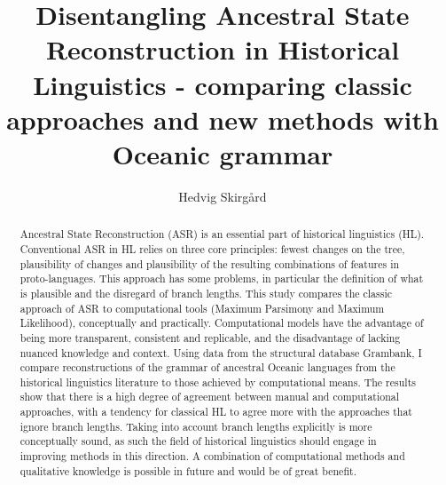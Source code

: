 \documentclass[12pt,letterpaper]{article}
\title{Disentangling Ancestral State Reconstruction in Historical Linguistics - comparing classic approaches and new methods with Oceanic grammar}
\author{Hedvig Skirgård}
\begin{document}

\thispagestyle{empty}


\maketitle
\thispagestyle{empty}





\begin{abstract}

Ancestral State Reconstruction (ASR) is an essential part of historical linguistics (HL). Conventional ASR in HL relies on three core principles: fewest changes on the tree,  plausibility of changes and plausibility of the resulting combinations of features in proto-languages. This approach has some problems, in particular the definition of what is plausible and the disregard of branch lengths. This study compares the classic approach of ASR to computational tools (Maximum Parsimony and Maximum Likelihood), conceptually and practically. Computational models have the advantage of being more transparent, consistent and replicable, and the disadvantage of lacking nuanced knowledge and context. Using data from the structural database Grambank, I compare reconstructions of the grammar of ancestral Oceanic languages from the historical linguistics literature to those achieved by computational means. The results show that there is a high degree of agreement between manual and computational approaches, with a tendency for classical HL to agree more with the approaches that ignore branch lengths. Taking into account branch lengths explicitly is more conceptually sound, as such the field of historical linguistics should engage in improving methods in this direction. A combination of computational methods and qualitative knowledge is possible in future and would be of great benefit.


\end{abstract}
\end{document}
